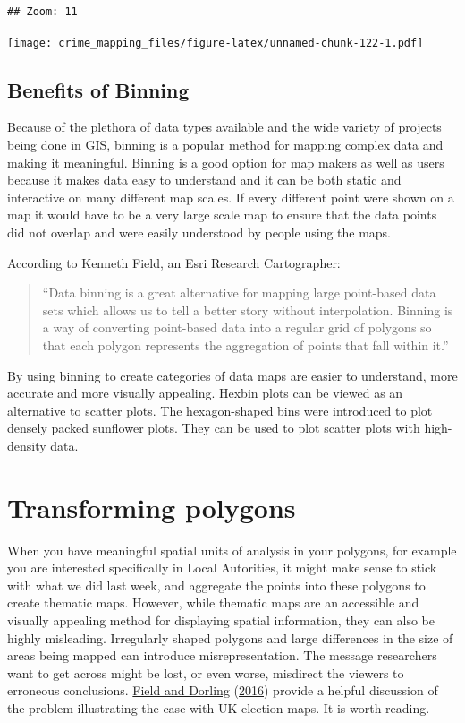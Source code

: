 \documentclass[
]{book}
\begin{document}
\begin{verbatim}
## Zoom: 11
\end{verbatim}

\texttt{[image: crime\_mapping\_files/figure-latex/unnamed-chunk-122-1.pdf]}

\hypertarget{benefits-of-binning}{%
\subsection{Benefits of Binning}\label{benefits-of-binning}}

Because of the plethora of data types available and the wide variety of projects being done in GIS, binning is a popular method for mapping complex data and making it meaningful. Binning is a good option for map makers as well as users because it makes data easy to understand and it can be both static and interactive on many different map scales. If every different point were shown on a map it would have to be a very large scale map to ensure that the data points did not overlap and were easily understood by people using the maps.

According to Kenneth Field, an Esri Research Cartographer:

\begin{quote}
``Data binning is a great alternative for mapping large point-based data sets which allows us to tell a better story without interpolation. Binning is a way of converting point-based data into a regular grid of polygons so that each polygon represents the aggregation of points that fall within it.''
\end{quote}

By using binning to create categories of data maps are easier to understand, more accurate and more visually appealing. Hexbin plots can be viewed as an alternative to scatter plots. The hexagon-shaped bins were introduced to plot densely packed sunflower plots. They can be used to plot scatter plots with high-density data.

\hypertarget{transforming-polygons}{%
\section{Transforming polygons}\label{transforming-polygons}}

When you have meaningful spatial units of analysis in your polygons, for example you are interested specifically in Local Autorities, it might make sense to stick with what we did last week, and aggregate the points into these polygons to create thematic maps. However, while thematic maps are an accessible and visually appealing method for displaying spatial information, they can also be highly misleading. Irregularly shaped polygons and large differences in the size of areas being mapped can introduce misrepresentation. The message researchers want to get across might be lost, or even worse, misdirect the viewers to erroneous conclusions. \protect\hyperlink{ref-Field_2016}{Field and Dorling} (\protect\hyperlink{ref-Field_2016}{2016}) provide a helpful discussion of the problem illustrating the case with UK election maps. It is worth reading.
\end{document}
